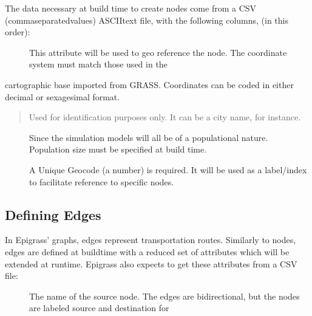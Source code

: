 \documentclass[letterpaper,10pt,english]{sphinxmanual}
\begin{document}
The data necessary at build time to create nodes come from a CSV (comma\sphinxhyphen{}separated\sphinxhyphen{}values) ASCII\sphinxhyphen{}text file, with the
following columns, (in this order):
\begin{description}
\item[{}] \leavevmode
This attribute will be used to geo reference the  node. The coordinate system must match those used in the

\end{description}

cartographic base imported from GRASS. Coordinates can be coded in either decimal or sexagesimal format.
\begin{quote}

Used for identification purposes only. It can be a city name, for instance.
\end{quote}
\begin{description}
\item[{}] \leavevmode
Since the simulation models will all be of a populational nature. Population size must be specified at build time.

\item[{}] \leavevmode
A Unique Geocode (a number) is required. It will be used as a label/index to facilitate  reference to specific nodes.

\end{description}

\ignorespaces 

\subsection{Defining Edges}
\label{\detokenize{overview:defining-edges}}\label{\detokenize{overview:index-2}}
In Epigrass’ graphs, edges represent transportation routes. Similarly to nodes, edges are defined at build\sphinxhyphen{}time with a
reduced set of attributes which will be extended at run\sphinxhyphen{}time. Epigrass also expects to get these attributes from a CSV file:
\begin{description}
\item[{}] \leavevmode
The name of the source node. The edges are bi\sphinxhyphen{}directional, but the nodes are labeled source and destination for

\end{description}
\end{document}
